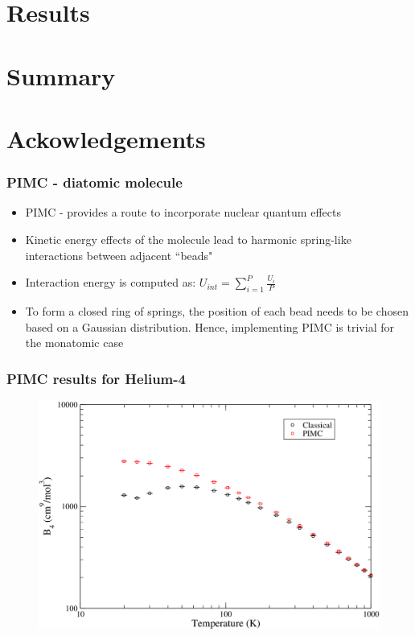 \documentclass[xcolor=svgnames]{beamer}
\begin{document}
	\section{Results}
	\section{Summary}
	\section*{Ackowledgements}

	\begin{frame}
	\frametitle{PIMC - diatomic molecule}
	\begin{itemize}
	\justifying
	\item PIMC - provides a route to incorporate nuclear quantum effects
	\item Kinetic energy effects of the molecule lead to harmonic spring-like interactions between adjacent ``beads"
	\begin{figure}
	\centering
	\def\svgscale{0.3}
	
	\end{figure}
	\item Interaction energy is computed as: $U_{int} = \displaystyle\sum\limits_{i=1}^P \frac{U_i}{P}$
	\begin{figure}
	\centering
	\def\svgscale{0.3}
	
	\end{figure}
	\item To form a closed ring of springs, the position of each bead needs to be chosen based on a Gaussian distribution. Hence, implementing PIMC is trivial for the monatomic case
	\end{itemize}
	\end{frame}
	
	\begin{frame}
	\frametitle{PIMC results for Helium-4\putCitation{Shaul2012}}
	\begin{figure}
	\centering
	\includegraphics[scale=0.2,keepaspectratio]{B4-Kate.png}
	\end{figure}
	\end{frame}
\end{document}
